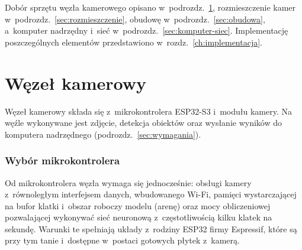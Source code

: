 Dobór sprzętu węzła kamerowego opisano w~podrozdz.~\ref{sec:wezel},
rozmieszczenie kamer w~podrozdz.~\ref{sec:rozmieszczenie}, obudowę
w~podrozdz.~\ref{sec:obudowa}, a~komputer nadrzędny i~sieć
w~podrozdz.~\ref{sec:komputer-siec}. Implementację poszczególnych
elementów przedstawiono w~rozdz.~\ref{ch:implementacja}.


\section{Węzeł kamerowy}
\label{sec:wezel}
Węzeł kamerowy składa się z~mikrokontrolera ESP32-S3 i~modułu kamery.
Na węźle wykonywane jest zdjęcie, detekcja obiektów oraz wysłanie wyników
do komputera nadrzędnego (podrozdz.~\ref{sec:wymagania}).

\subsubsection*{Wybór mikrokontrolera}

Od mikrokontrolera węzła wymaga się jednocześnie: obsługi kamery
z~równoległym interfejsem danych, wbudowanego Wi-Fi, pamięci
wystarczającej na bufor klatki i~obszar roboczy modelu (arenę) oraz mocy
obliczeniowej pozwalającej wykonywać sieć neuronową z~częstotliwością
kilku klatek na sekundę. Warunki te spełniają układy z~rodziny ESP32
firmy Espressif, które są przy tym tanie i~dostępne w~postaci gotowych
płytek z~kamerą.

